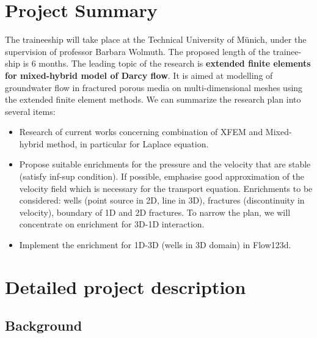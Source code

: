 \documentclass{sna}
\begin{document}
\section{Project Summary}
The traineeship will take place at the Technical University of M{\" u}nich, under the supervision of professor
Barbara Wolmuth. The proposed length of the trainee-ship is 6 months. The leading topic of the research is 
\textbf{extended finite elements for mixed-hybrid model of Darcy flow}. It is aimed at modelling of groundwater 
flow in fractured porous media on multi-dimensional meshes using the extended finite element methods. 
We can summarize the research plan into several items:
\begin{itemize}
  \item Research of current works concerning combination of XFEM and Mixed-hybrid method, in particular for Laplace equation. 
  \item Propose suitable enrichments for the pressure and the velocity that are stable (satisfy inf-sup condition). 
        If possible, emphasise good approximation of the velocity field which is necessary for the transport equation. 
        Enrichments to be considered: wells (point source in 2D, line in 3D), fractures (discontinuity in velocity), 
        boundary of 1D and 2D  fractures. To narrow the plan, we will concentrate on enrichment for 3D-1D interaction.
  \item Implement the enrichment for 1D-3D (wells in 3D domain) in Flow123d.
\end{itemize}



\section{Detailed project description}
\subsection{Background} \label{sec:background}
\end{document}
